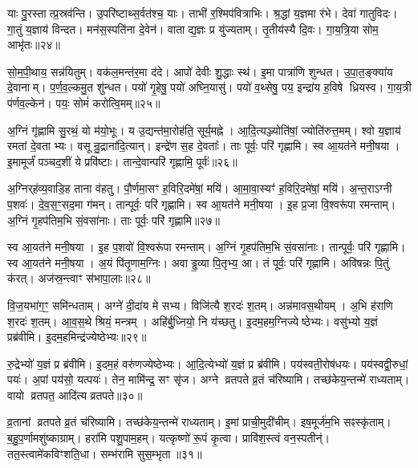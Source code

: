 याः पु॒रस्तात्प्र॒स्रव॑न्ति।
उ॒परि॑ष्टाथ्स॒र्वत॑श्च॒ याः।
ताभी॑ र॒श्मिप॑वित्राभिः।
श्र॒द्धां य॒ज्ञमा र॑भे।
देवा॑ गातुविदः।
गा॒तुं य॒ज्ञाय॑ विन्दत।
मन॑स॒स्पति॑ना दे॒वेन॑।
वाताद्य॒ज्ञः प्र यु॑ज्यताम्।
तृ॒तीय॑स्यै दि॒वः।
गा॒य॒त्रि॒या सोम॒ आभृ॑तः॥२४॥

सो॒म॒पी॒थाय॒ सन्न॑यितुम्।
वक॑ल॒मन्त॑र॒मा द॑दे।
आपो॑ देवीः शु॒द्धाः स्थ॑।
इ॒मा पात्रा॑णि शुन्धत।
उ॒पा॒त॒ङ्क्या॑य दे॒वानाम्।
प॒र्ण॒व॒ल्कमु॒त शु॑न्धत।
पयो॑ गृ॒हेषु॒ पयो॑ अघ्नि॒यासु॑।
पयो॑ व॒थ्सेषु॒ पय॒ इन्द्रा॑य ह॒विषे ध्रियस्व।
गा॒य॒त्री प॑र्णव॒ल्केन॑।
पयः॒ सोमं॑ करोत्वि॒मम्॥२५॥

अ॒ग्निं गृ॑ह्णामि सु॒रथं॒ यो म॑यो॒भूः।
य उ॒द्यन्त॑मा॒रोह॑ति॒ सूर्य॒मह्ने।
आ॒दि॒त्यञ्ज्योति॑षां॒ ज्योति॑रुत्त॒मम्।
श्वो य॒ज्ञाय॑ रमतां दे॒वताभ्यः।
वसून्रु॒द्राना॑दि॒त्यान्।
इन्द्रे॑ण स॒ह दे॒वताः᳚।
ताः पूर्वः॒ परि॑ गृह्णामि।
स्व आ॒यत॑ने मनी॒षया।
इ॒मामूर्जं॑ पञ्चद॒शीं ये प्रवि॑ष्टाः।
तान्दे॒वान्परि॑ गृह्णामि॒ पूर्वः॑॥२६॥

अ॒ग्निर्‌\mbox{}ह॑व्य॒वाडि॒ह ताना व॑हतु।
पौ॒र्णमा॒सꣳ ह॒विरि॒दमे॑षां॒ मयि॑।
आ॒मा॒वा॒स्यꣳ॑ ह॒विरि॒दमे॑षां॒ मयि॑।
अ॒न्त॒रा\-ऽग्नी प॒शवः॑।
दे॒व॒स॒ꣳ॒सद॒मा ग॑मन्।
तान्पूर्वः॒ परि॑ गृह्णामि।
स्व आ॒यत॑ने मनी॒षया।
इ॒ह प्र॒जा वि॒श्वरू॑पा रमन्ताम्।
अ॒ग्निं गृ॒हप॑तिम॒भि सं॒वसा॑नाः।
ताः पूर्वः॒ परि॑ गृह्णामि॥२७॥

स्व आ॒यत॑ने मनी॒षया।
इ॒ह प॒शवो॑ वि॒श्वरू॑पा रमन्ताम्।
अ॒ग्निं गृ॒हप॑तिम॒भि सं॒वसा॑नाः।
तान्पूर्वः॒ परि॑ गृह्णामि।
स्व आ॒यत॑ने मनी॒षया।
अ॒यं पि॑तृ॒णाम॒ग्निः।
अवाड्ढ॒व्या पि॒तृभ्य॒ आ।
तं पूर्वः॒ परि॑ गृह्णामि।
अवि॑षन्नः पि॒तुं क॑रत्।
अज॑स्र॒न्त्वाꣳ स॑भापा॒लाः॥२८॥

वि॒ज॒यभा॑ग॒ꣳ॒ समि॑न्धताम्।
अग्ने॑ दी॒दा॑य मे सभ्य।
विजि॑त्यै श॒रदः॑ श॒तम्।
अन्न॑मावस॒थीयम्।
अ॒भि ह॑राणि श॒रदः॑ श॒तम्।
आ॒व॒स॒थे श्रियं॒ मन्त्रम्।
अहि॑र्बु॒ध्नियो॒ नि य॑च्छतु।
इ॒दम॒हम॒ग्निज्येष्ठेभ्यः।
वसु॑भ्यो य॒ज्ञं प्रब्र॑वीमि।
इ॒दम॒हमिन्द्र॑ज्येष्ठेभ्यः॥२९॥

रु॒द्रेभ्यो॑ य॒ज्ञं प्र ब्र॑वीमि।
इ॒दम॒हं वरु॑णज्येष्ठेभ्यः।
आ॒दि॒त्येभ्यो॑ य॒ज्ञं प्र ब्र॑वीमि।
पय॑स्वती॒रोष॑धयः।
पय॑स्वद्वी॒रुधां॒ पयः॑।
अ॒पां पय॑सो॒ यत्पयः॑।
तेन॒ मामि॑न्द्र॒ सꣳ सृ॑ज।
अग्ने व्रतपते व्र॒तं च॑रिष्यामि।
तच्छ॑केय॒न्तन्मे॑ राध्यताम्।
वायो व्रतपत॒ आदि॑त्य व्रतपते॥३०॥

व्र॒तानां व्रतपते व्र॒तं च॑रिष्यामि।
तच्छ॑केय॒न्तन्मे॑ राध्यताम्।
इ॒मां प्राची॒मुदी॑चीम्।
इष॒मूर्ज॑म॒भि सꣴस्कृ॑ताम्।
ब॒हु॒प॒र्णामशु॑ष्काग्राम्।
हरा॑मि पशु॒पाम॒हम्।
यत्कृष्णो॑ रू॒पं कृ॒त्वा।
प्रावि॑श॒स्त्वं वन॒स्पतीन्॑।
तत॒स्त्वामे॑कविꣳशति॒धा।
सम्भ॑रामि सुस॒म्भृता॥३१॥

